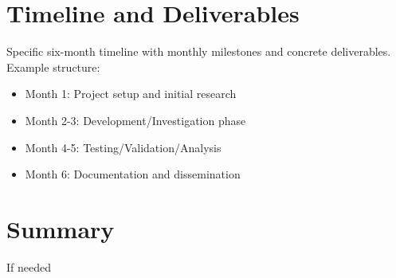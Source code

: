 \documentclass[letterpaper, 11pt]{article}
\begin{document}
\section{Timeline and Deliverables}

Specific six-month timeline with monthly milestones and concrete deliverables.
Example structure:

\begin{itemize}
  \item Month 1: Project setup and initial research
  \item Month 2-3: Development/Investigation phase
  \item Month 4-5: Testing/Validation/Analysis
  \item Month 6: Documentation and dissemination
\end{itemize}

\section{Summary}

If needed

%
\vspace*{-0.25cm}
\begin{footnotesize}
%
%
\end{footnotesize}
\end{document}
